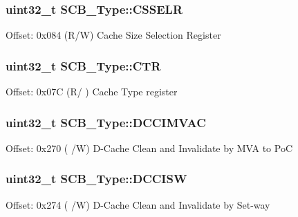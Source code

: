 \subsubsection[{\texorpdfstring{C\+S\+S\+E\+LR}{CSSELR}}]{ uint32\+\_\+t S\+C\+B\+\_\+\+Type\+::\+C\+S\+S\+E\+LR}\hypertarget{structSCB__Type_afdc87bd02624a24c3bef7f56511c5444}{}\label{structSCB__Type_afdc87bd02624a24c3bef7f56511c5444}
Offset\+: 0x084 (R/W) Cache Size Selection Register 
\subsubsection[{\texorpdfstring{C\+TR}{CTR}}]{ uint32\+\_\+t S\+C\+B\+\_\+\+Type\+::\+C\+TR}\hypertarget{structSCB__Type_ab207e64e1e857ea1b68895172264bd8d}{}\label{structSCB__Type_ab207e64e1e857ea1b68895172264bd8d}
Offset\+: 0x07C (R/ ) Cache Type register 
\subsubsection[{\texorpdfstring{D\+C\+C\+I\+M\+V\+AC}{DCCIMVAC}}]{ uint32\+\_\+t S\+C\+B\+\_\+\+Type\+::\+D\+C\+C\+I\+M\+V\+AC}\hypertarget{structSCB__Type_a29db2ff9cf75c787ea350468fc224408}{}\label{structSCB__Type_a29db2ff9cf75c787ea350468fc224408}
Offset\+: 0x270 ( /W) D-\/\+Cache Clean and Invalidate by M\+VA to PoC 
\subsubsection[{\texorpdfstring{D\+C\+C\+I\+SW}{DCCISW}}]{ uint32\+\_\+t S\+C\+B\+\_\+\+Type\+::\+D\+C\+C\+I\+SW}\hypertarget{structSCB__Type_a16e05cc18ec7ab501620bf7263f226e7}{}\label{structSCB__Type_a16e05cc18ec7ab501620bf7263f226e7}
Offset\+: 0x274 ( /W) D-\/\+Cache Clean and Invalidate by Set-\/way 

